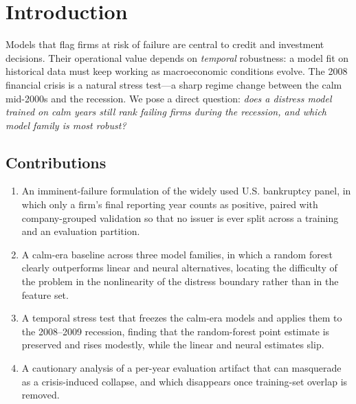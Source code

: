 \documentclass[manuscript,nonacm]{acmart}
\begin{document}


\maketitle


\section{Introduction}
Models that flag firms at risk of failure are central to credit and investment
decisions. Their operational value depends on \emph{temporal} robustness: a model fit on
historical data must keep working as macroeconomic conditions evolve. The 2008 financial
crisis is a natural stress test---a sharp regime change between the calm mid-2000s and
the recession. We pose a direct question: \emph{does a distress model trained on calm
years still rank failing firms during the recession, and which model family is most
robust?}

\subsection{Contributions}
\begin{enumerate}
\item An imminent-failure formulation of the widely used U.S. bankruptcy panel, in which
      only a firm's final reporting year counts as positive, paired with
      company-grouped validation so that no issuer is ever split across a training and
      an evaluation partition.
\item A calm-era baseline across three model families, in which a random forest clearly
      outperforms linear and neural alternatives, locating the difficulty of the problem
      in the nonlinearity of the distress boundary rather than in the feature set.
\item A temporal stress test that freezes the calm-era models and applies them to the
      2008--2009 recession, finding that the random-forest point estimate is preserved
      and rises modestly, while the linear and neural estimates slip.
\item A cautionary analysis of a per-year evaluation artifact that can masquerade as a
      crisis-induced collapse, and which disappears once training-set overlap is
      removed.
\end{enumerate}
\end{document}
